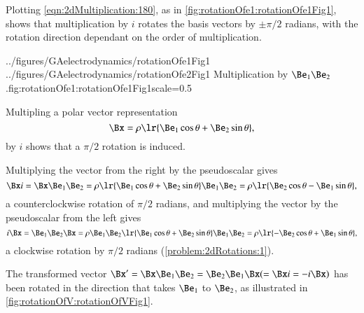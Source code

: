 %
%

Plotting \cref{eqn:2dMultiplication:180}, as in
\cref{fig:rotationOfe1:rotationOfe1Fig1},
 shows that multiplication by \( i \) rotates the  basis vectors by \( \pm \pi/2 \) radians,
with the
rotation direction dependant on the order of multiplication.

\imageTwoFigures
{../figures/GAelectrodynamics/rotationOfe1Fig1}
{../figures/GAelectrodynamics/rotationOfe2Fig1}
{Multiplication by \( \Be_1 \Be_2 \).}{fig:rotationOfe1:rotationOfe1Fig1}{scale=0.5}

Multipling a polar vector representation
\begin{dmath}\label{eqn:2dRotations:280}
   \Bx = \rho \lr{ \Be_1 \cos\theta + \Be_2 \sin\theta },
\end{dmath}
by \( i \) shows that a \( \pi/2 \) rotation is induced.

Multiplying the vector from the right by the pseudoscalar gives
\begin{dmath}\label{eqn:2dRotations:300}
\Bx i
= \Bx \Be_1 \Be_2
= \rho \lr{ \Be_1 \cos\theta + \Be_2 \sin\theta } \Be_1 \Be_2
= \rho \lr{ \Be_2 \cos\theta - \Be_1 \sin\theta },
\end{dmath}
a counterclockwise rotation of \( \pi/2 \) radians, and
multiplying the vector by the pseudoscalar from the left gives
\begin{dmath}\label{eqn:2dRotations:3}
i \Bx
= \Be_1 \Be_2 \Bx
= \rho \Be_1 \Be_2 \lr{ \Be_1 \cos\theta + \Be_2 \sin\theta } \Be_1 \Be_2
= \rho \lr{ -\Be_2 \cos\theta + \Be_1 \sin\theta },
\end{dmath}
a clockwise rotation by \( \pi/2 \) radians
(\cref{problem:2dRotations:1}).

The transformed vector \( \Bx' = \Bx \Be_1 \Be_2 = \Be_2 \Be_1 \Bx (=\Bx i = -i \Bx) \) has been rotated in the direction that takes \( \Be_1 \) to \( \Be_2 \), as illustrated
in \cref{fig:rotationOfV:rotationOfVFig1}.


